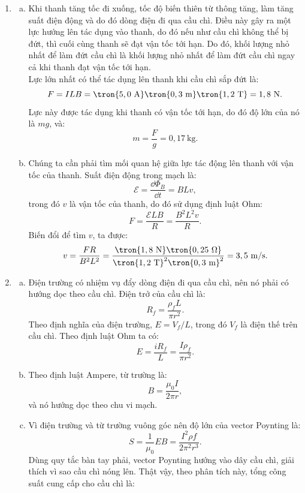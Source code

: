 \begin{loigiai}
\begin{enumerate}[1]
    \item \begin{enumerate}[a)]
        \item Khi thanh tăng tốc đi xuống, tốc độ biến thiên từ thông tăng, làm tăng suất điện động và do đó dòng điện đi qua cầu chì. Điều này gây ra một lực hướng lên tác dụng vào thanh, do đó nếu như cầu chì không thể bị đứt, thì cuối cùng thanh sẽ đạt vận tốc tới hạn. Do đó, khối lượng nhỏ nhất để làm đứt cầu chì là khối lượng nhỏ nhất để làm đứt cầu chì ngay cả khi thanh đạt vận tốc tới hạn.\\
        Lực lớn nhất có thể tác dụng lên thanh khi cầu chì sắp đứt là:
        $$F=ILB=\tron{5,0\ \mathrm{A}}\tron{0,3\ \mathrm{m}}\tron{1,2\ \mathrm{T}}=1,8\ \mathrm{N}.$$
        Lực này được tác dụng khi thanh có vận tốc tới hạn, do đó độ lớn của nó là $mg$, và:
        $$m=\dfrac{F}{g}=0,17\ \mathrm{kg}.$$
        \item Chúng ta cần phải tìm mối quan hệ giữa lực tác động lên thanh với vận tốc của thanh. Suất điện động trong mạch là:
        $$\mathcal{E}=\dfrac{\dd \Phi_B}{\dd t}=BLv,$$
        trong đó $v$ là vận tốc của thanh, do đó sử dụng định luật Ohm:
        $$F=\dfrac{\mathcal{E}LB}{R}=\dfrac{B^2L^2v}{R}.$$
        Biến đổi để tìm $v$, ta được:
        $$v=\dfrac{FR}{B^2L^2}=\dfrac{\tron{1,8\ \mathrm{N}}\tron{0,25\ \mathrm{\Omega}}}{\tron{1,2\ \mathrm{T}}^2\tron{0,3\ \mathrm{m}}^2}=3,5\ \mathrm{m/s}.$$
    \end{enumerate}
    \item \begin{enumerate}[a)]
        \item Điện trường có nhiệm vụ đẩy dòng điện đi qua cầu chì, nên nó phải có hướng dọc theo cầu chì. Điện trở của cầu chì là:
        $$R_f=\dfrac{\rho_f L}{\pi r^2}.$$
        Theo định nghĩa của điện trường, $E=V_f/L$, trong đó $V_f$ là điện thế trên cầu chì. Theo định luật Ohm ta có:
        $$E=\dfrac{i R_f}{L}=\dfrac{I\rho_f}{\pi r^2}.$$
        \item Theo định luật Ampere, từ trường là:
        $$B=\dfrac{\mu_0 I}{2\pi r},$$
        và nó hướng dọc theo chu vi mạch.
        \item Vì điện trường và từ trường vuông góc nên độ lớn của vector Poynting là:
        $$S=\dfrac{1}{\mu_0}EB=\dfrac{I^2 \rho f}{2\pi^2r^3}.$$
        Dùng quy tắc bàn tay phải, vector Poynting hướng vào dây cầu chì, giải thích vì sao cầu chì nóng lên. Thật vậy, theo phân tích này, tổng công suất cung cấp cho cầu chì là:

\end{enumerate}
\end{enumerate}
\end{loigiai}
